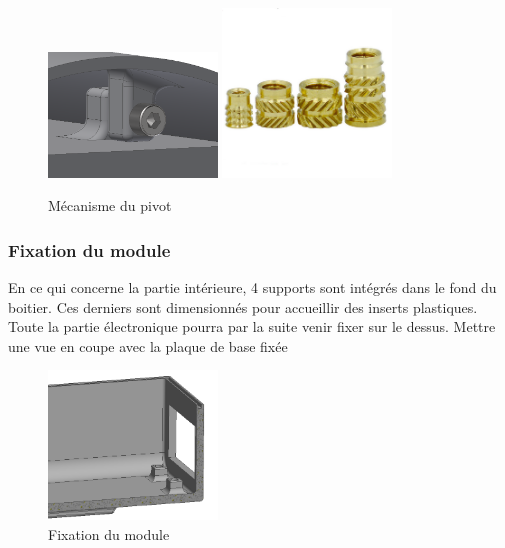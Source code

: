 \begin{figure}[H]
    \centering
    \includegraphics[width=0.4\textwidth]{Images/photos_PGA/fixcasquette.PNG}
    \includegraphics[width=0.4\textwidth]{Images/photos_PGA/inserts.jpg}
    \caption{Mécanisme du pivot}
    \label{fig:casquette}
\end{figure}

\subsubsection{Fixation du module}

En ce qui concerne la partie intérieure, 4 supports sont intégrés dans le fond du boitier. Ces derniers 
sont dimensionnés pour accueillir des inserts plastiques. Toute la partie électronique pourra par la 
suite venir fixer sur le dessus. Mettre une vue en coupe avec la plaque de base fixée

\begin{figure}[H]
    \centering
    \includegraphics[width=0.4\textwidth]{Images/photos_PGA/fixationbaseModule.PNG}
    \caption{Fixation du module}
    \label{fig:fixbase}
\end{figure}


